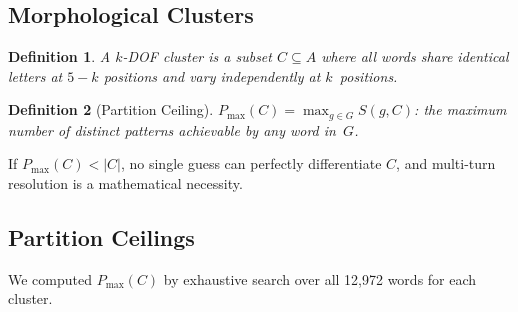 \documentclass[11pt]{article}
\newtheorem{definition}{Definition}
\begin{document}
	\subsection{Morphological Clusters}
	
	\begin{definition}
		A \emph{$k$-DOF cluster} is a subset $C \subseteq A$ where all words share identical letters at $5-k$ positions and vary independently at $k$~positions.
	\end{definition}
	
	\begin{definition}[Partition Ceiling]
		$P_{\max}(C) = \max_{g \in G} S(g,C)$: the maximum number of distinct patterns achievable by any word in~$G$.
	\end{definition}
	
	If $P_{\max}(C) < |C|$, no single guess can perfectly differentiate $C$, and multi-turn resolution is a mathematical necessity.
	
	\subsection{Partition Ceilings}
	
	We computed $P_{\max}(C)$ by exhaustive search over all 12,972 words for each cluster.
	
\end{document}
